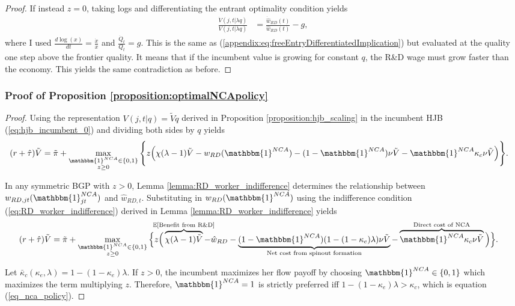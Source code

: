 \documentclass[11pt,english]{article}
\theoremstyle{definition}
\begin{document}
\begin{proof}
	If instead $z = 0$, taking logs and differentiating the entrant optimality condition yields
	\begin{align}
		\frac{\dot{V}(j,t|\lambda q)}{V(j,t|\lambda q)} &= \frac{\dot{\hat{w}}_{RD}(t)}{\hat{w}_{RD}(t)} - g,
	\end{align}
	where I used $\frac{d\log(x)}{dt} = \frac{\dot{x}}{x}$ and $\frac{\dot{Q}_t}{Q_t} = g$. This is the same as (\ref{appendix:eq:freeEntryDifferentiatedImplication}) but evaluated at the quality one step above the frontier quality. It means that if the incumbent value is growing for constant $q$, the R\&D wage must grow faster than the economy. This yields the same contradiction as before. 
\end{proof}

\subsubsection{Proof of Proposition \ref{proposition:optimalNCApolicy}}\label{appendix:proofs:proposition:optimalNCApolicy}

\begin{proof}
	Using the representation $V(j,t|q) = \tilde{V}q$ derived in Proposition \ref{proposition:hjb_scaling} in the incumbent HJB (\ref{eq:hjb_incumbent_0}) and dividing both sides by $q$ yields
	\begin{align*}
		(r + \hat{\tau}) &\tilde{V} = \tilde{\pi} + \max_{\substack{\mathbbm{1}^{NCA} \in \{0,1\} \\ z \ge 0}} \Bigg\{ z \Big( \chi (\lambda -1) \tilde{V}- w_{RD}(\mathbbm{1}^{NCA}) - (1-\mathbbm{1}^{NCA}) \nu \tilde{V} - \mathbbm{1}^{NCA} \kappa_c \nu \tilde{V} \Big)\Bigg\}.
	\end{align*}
	
	In any symmetric BGP with $z > 0$, Lemma \ref{lemma:RD_worker_indifference} determines the relationship between $w_{RD,jt}(\mathbbm{1}^{NCA}_{jt})$ and $\hat{w}_{RD,t}$.  Substituting in $w_{RD}(\mathbbm{1}^{NCA})$ using the indifference condition (\ref{eq:RD_worker_indifference}) derived in Lemma \ref{lemma:RD_worker_indifference} yields
	\begin{align*}
		(r + \hat{\tau}) \tilde{V} &= \tilde{\pi} + \max_{\substack{\mathbbm{1}^{NCA} \in \{0,1\} \\ z \ge 0}} \Big\{z \Big( \overbrace{\chi (\lambda - 1) \tilde{V}}^{\mathclap{\mathbb{E}[\textrm{Benefit from R\&D}]}}- \hat{w}_{RD} -  \underbrace{(1-\mathbbm{1}^{NCA})(1 - (1-\kappa_{e})\lambda)\nu \tilde{V}}_{\mathclap{\text{Net cost from spinout formation}}} - \overbrace{\mathbbm{1}^{NCA} \kappa_{c} \nu \tilde{V}}^{\mathclap{\text{Direct cost of NCA}}}\Big) \Big\}.
	\end{align*}
	
	Let $\bar{\kappa}_c (\kappa_e, \lambda) = 1 - (1-\kappa_e)\lambda$. If $z > 0$, the incumbent maximizes her flow payoff by choosing $\mathbbm{1}^{NCA} \in \{0,1\}$ which maximizes the term multiplying $z$. Therefore, $\mathbbm{1}^{NCA} = 1$ is strictly preferred iff $1 - (1-\kappa_e) \lambda > \kappa_c$, which is equation (\ref{eq_nca_policy}).
\end{proof}
\end{document}
